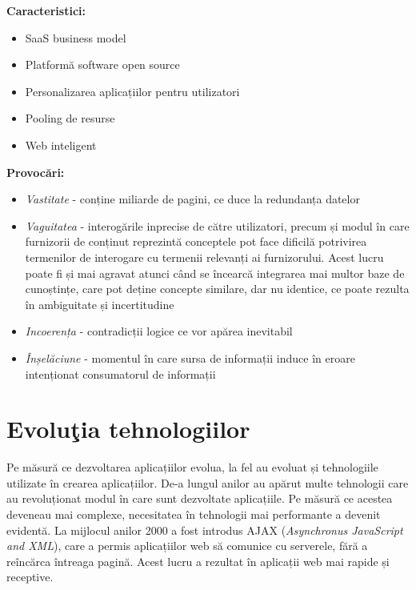 \documentclass[12pt, a4paper]{report}
\begin{document}

\textbf{Caracteristici:}
\begin{itemize}
	\item SaaS business model
	\item Platformă software open source
	\item Personalizarea aplicațiilor pentru utilizatori
	\item Pooling de resurse
	\item Web inteligent
\end{itemize}


\textbf{Provocări:}
\begin{itemize}
	\item \emph{Vastitate} - conține miliarde de pagini, ce duce la redundanța datelor
	\item \emph{Vaguitatea} - interogările inprecise de către utilizatori, precum și modul în care furnizorii de conținut reprezintă conceptele pot face dificilă potrivirea termenilor de interogare cu termenii relevanți ai furnizorului. Acest lucru poate fi și mai agravat atunci când se încearcă integrarea mai multor baze de cunoștințe, care pot deține concepte similare, dar nu identice, ce poate rezulta în ambiguitate și incertitudine
	\item \emph{Incoerența} - contradicții logice ce vor apărea inevitabil
	\item \emph{Înșelăciune} - momentul în care sursa de informații induce în eroare intenționat consumatorul de informații
\end{itemize}

\section{Evolu\c tia tehnologiilor}

Pe măsură ce dezvoltarea aplicațiilor evolua, la fel au evoluat și tehnologiile utilizate în crearea aplicațiilor. De-a lungul anilor au apărut multe tehnologii care au revoluționat modul în care sunt dezvoltate aplicațiile. Pe măsură ce acestea deveneau mai complexe, necesitatea în tehnologii mai performante a devenit evidentă. La mijlocul anilor 2000 a fost introdus AJAX (\emph{Asynchronus JavaScript and XML}), care a permis aplicațiilor web să comunice cu serverele, fără a reîncărca întreaga pagină. Acest lucru a rezultat în aplicații web mai rapide și receptive. \cite{ajax}
\end{document}

